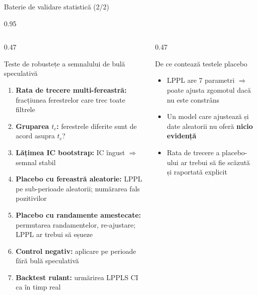 \documentclass[9pt, aspectratio=169, t]{beamer}
\begin{document}
\begin{frame}{Baterie de validare statistică (2/2)}
    \begin{cminipage}{0.95\textwidth}
    {\scriptsize
    \begin{columns}[T]
        \begin{column}{0.47\textwidth}
            \begin{block}{Teste de robustețe a semnalului de bulă speculativă}
                \begin{enumerate}\setlength{\itemsep}{0pt}
                    \item \textbf{Rata de trecere multi-fereastră:} fracțiunea ferestrelor care trec toate filtrele
                    \item \textbf{Gruparea $t_c$:} ferestrele diferite sunt de acord asupra $t_c$?
                    \item \textbf{Lățimea IC bootstrap:} IC îngust $\Rightarrow$ semnal stabil
                    \item \textbf{Placebo cu fereastră aleatorie:} LPPL pe sub-perioade aleatorii; numărarea fals pozitivilor
                    \item \textbf{Placebo cu randamente amestecate:} permutarea randamentelor, re-ajustare; LPPL ar trebui să eșueze
                    \item \textbf{Control negativ:} aplicare pe perioade fără bulă speculativă
                    \item \textbf{Backtest rulant:} urmărirea LPPLS CI ca în timp real
                \end{enumerate}
            \end{block}
        \end{column}
        \begin{column}{0.47\textwidth}
            \begin{alertblock}{De ce contează testele placebo}
                \begin{itemize}\setlength{\itemsep}{0pt}
                    \item LPPL are 7 parametri $\Rightarrow$ poate ajusta zgomotul dacă nu este constrâns
                    \item Un model care ajustează și date aleatorii nu oferă \textbf{nicio evidență}
                    \item Rata de trecere a placebo-ului ar trebui să fie scăzută și raportată explicit
                \end{itemize}
            \end{alertblock}

\end{column}
\end{columns}}
\end{cminipage}
\end{frame}
\end{document}
